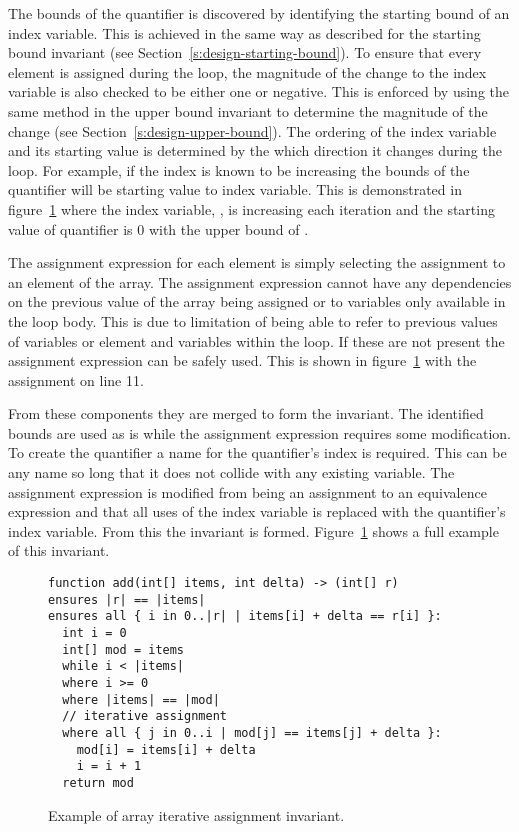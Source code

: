 The bounds of the quantifier is discovered by identifying the
starting bound of an index variable.
This is achieved in the same way as described for the starting bound
invariant (see Section~\ref{s:design-starting-bound}).
To ensure that every element is assigned during the loop, the magnitude of
the change to the index variable is also checked to be either one or negative.
This is enforced by using the same method in the upper bound invariant to
determine the magnitude of the change (see Section~\ref{s:design-upper-bound}).
The ordering of the index variable and its starting value is determined
by the which direction it changes during the loop.
For example, if the index is known to be increasing the bounds of the 
quantifier will be starting value to index variable.
This is demonstrated in figure~\ref{lst:array-iter-assign} where
the index variable, , is increasing each iteration and
the starting value of quantifier is 0 with the upper bound of .

The assignment expression for each element is simply selecting the
assignment to an element of the array.
The assignment expression cannot have any dependencies on the previous
value of the array being assigned or to variables only available in the loop body.
This is due to limitation of being able to refer to previous values of
variables or element and variables within the loop.
If these are not present the assignment expression can be
safely used.
This is shown in figure~\ref{lst:array-iter-assign} with the 
assignment on line 11.

From these components they are merged to form the invariant.
The identified bounds are used as is while the assignment expression
requires some modification.
To create the quantifier a name for the quantifier's index is required.
This can be any name so long that it does not collide with any existing variable.
The assignment expression is modified from being an assignment to an equivalence
expression and that all uses of the index variable is replaced with the
quantifier's index variable.
From this the invariant is formed.
Figure~\ref{lst:array-iter-assign} shows a full example of this invariant.

\begin{figure}[ht]
\begin{lstlisting}
function add(int[] items, int delta) -> (int[] r)
ensures |r| == |items|
ensures all { i in 0..|r| | items[i] + delta == r[i] }:
  int i = 0
  int[] mod = items
  while i < |items|
  where i >= 0
  where |items| == |mod|
  // iterative assignment
  where all { j in 0..i | mod[j] == items[j] + delta }:
    mod[i] = items[i] + delta
    i = i + 1
  return mod
\end{lstlisting}
\caption{Example of array iterative assignment invariant.}
\label{lst:array-iter-assign}
\end{figure}
